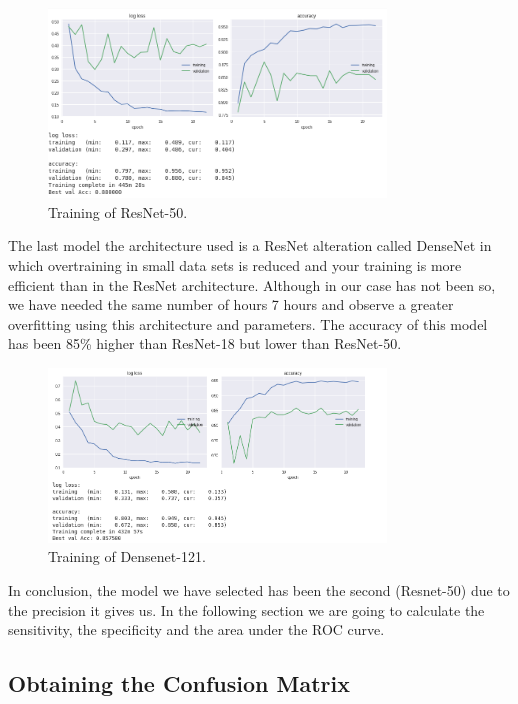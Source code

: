 \begin{figure}[H]
\centering
\includegraphics[width=0.8\textwidth]{./figures/resnet-50}
\caption{Training of ResNet-50.}
\end{figure}

The last model the architecture used is a ResNet alteration called DenseNet in which overtraining in small data sets is reduced and your training is more efficient than in the ResNet architecture. Although in our case has not been so, we have needed the same number of hours 7 hours and observe a greater overfitting using this architecture and parameters. The accuracy of this model has been 85\% higher than ResNet-18 but lower than ResNet-50.


\begin{figure}[H]
\centering
\includegraphics[width=0.8\textwidth]{./figures/densenet-121}
\caption{Training of Densenet-121.}
\end{figure}


In conclusion, the model we have selected has been the second (Resnet-50) due to the precision it gives us. In the following section we are going to calculate the sensitivity, the specificity and the area under the ROC curve.


\subsection{Obtaining the Confusion Matrix}

